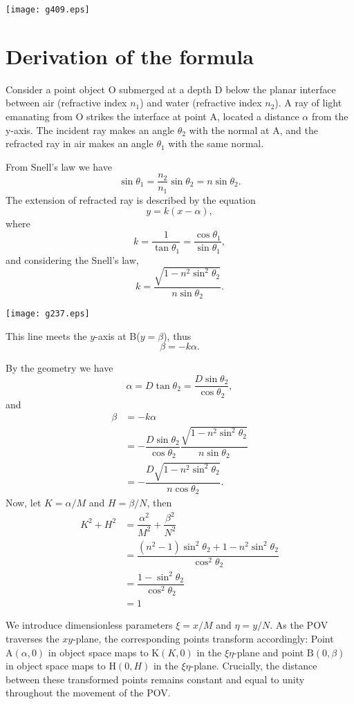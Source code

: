 \documentclass[twocolumn]{article}
\begin{document}
\texttt{[image: g409.eps]}

\section{Derivation of the formula}

Consider a point object O submerged at a depth D below the planar interface 
between air (refractive index $n_1$) and water (refractive index $n_2$). 
A ray of light emanating from O strikes the interface at point A, located a 
distance $\alpha$ from the y-axis. The incident ray makes an angle $\theta_2$ 
with the normal at A, and the refracted ray in air makes an angle $\theta_1$ 
with the same normal.

From Snell's law we have
$$ \sin\theta_1 = \frac{n_2}{n_1} \sin\theta_2 = n\sin\theta_2.$$
The extension of refracted ray is described by the equation 
$$y=k(x-\alpha),$$
where 
$$k=\dfrac{1}{\tan\theta_1}=\dfrac{\cos\theta_1}{\sin\theta_1},$$
and considering the Snell's law,
$$k=\dfrac{\sqrt{1-n^2\sin^2\theta_2}}{n\sin\theta_2}.$$

\texttt{[image: g237.eps]}

This line meets the $y$-axis at B($y=\beta$), thus
$$\beta = -k\alpha.$$

By the geometry we have
$$\alpha = D\tan\theta_2 = \dfrac{D\sin\theta_2}{\cos\theta_2},$$
and
$$\begin{aligned}
	\beta &= -k\alpha \\
	&= -\dfrac{D\sin\theta_2}{\cos\theta_2}
	\dfrac{\sqrt{1-n^2\sin^2\theta_2}}{n\sin\theta_2}\\
	&=-\dfrac{D\sqrt{1-n^2\sin^2\theta_2}}{n\cos\theta_2}.
\end{aligned}$$
Now, let $K=\alpha/M$ and $H=\beta/N$, then
$$ \begin{aligned}
	K^2 + H^2 &= \dfrac{\alpha^2}{M^2}+\dfrac{\beta^2}{N^2}\\
	&=\dfrac{\left(n^2-1\right)\sin^2\theta_2 + 1-n^2\sin^2\theta_2}
	{\cos^2\theta_2}\\
	&=\dfrac{1-\sin^2\theta_2}{\cos^2\theta_2}\\
	&=1
\end{aligned}$$

We introduce dimensionless parameters $\xi=x/M$ and $\eta=y/N$. 
As the POV traverses the $xy$-plane, the corresponding points transform accordingly:
Point $\mathrm{A}(\alpha, 0)$ in object space maps to $\mathrm{K}(K, 0)$ in the $\xi\eta$-plane 
and point $\mathrm{B}(0, \beta)$ in object space maps to $\mathrm{H}(0, H)$ in the $\xi\eta$-plane. 
Crucially, the distance between these transformed points remains constant and equal 
to unity throughout the movement of the POV.
\end{document}
